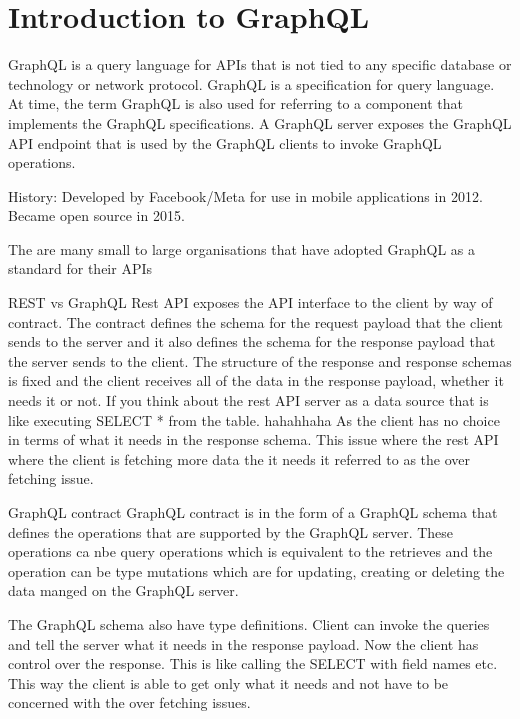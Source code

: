 \documentclass[a4paper, 11pt]{book}
\begin{document}


    \section{Introduction to GraphQL}

    GraphQL is a query language for APIs that is not tied to any specific database or technology or network protocol.
    GraphQL is a specification for query language.
    At time, the term GraphQL is also used for referring to a component that implements the GraphQL specifications.
    A GraphQL server exposes the GraphQL API endpoint that is used by the GraphQL clients to invoke GraphQL operations.

    History: Developed by Facebook/Meta for use in mobile applications in 2012. Became open source in 2015.

    The are many small to large organisations that have adopted GraphQL as a standard for their APIs

    REST vs GraphQL
    Rest API exposes the API interface to the client by way of contract.
    The contract defines the schema for the request payload that the client sends to the server and it also defines the schema for the response payload that the server sends to the client.
    The structure of the response and response schemas is fixed and the client receives all of the data in the response payload, whether it needs it or not.
    If you think about the rest API server as a data source that is like executing SELECT * from the table. hahahhaha
    As the client has no choice in terms of what it needs in the response schema.
    This issue where the rest API where the client is fetching more data the it needs it referred to as the over fetching issue.

    GraphQL contract
    GraphQL contract is in the form of a GraphQL schema that defines the operations that are supported by the GraphQL server.
    These operations ca nbe query operations which is equivalent to the retrieves and the operation can be type mutations which are for updating, creating or deleting the data manged on the GraphQL server.

    The GraphQL schema also have type definitions.
    Client can invoke the queries and tell the server what it needs in the response payload.
    Now the client has control over the response.
    This is like calling the SELECT with field names etc.
    This way the client is able to get only what it needs and not have to be concerned with the over fetching issues.
\end{document}
